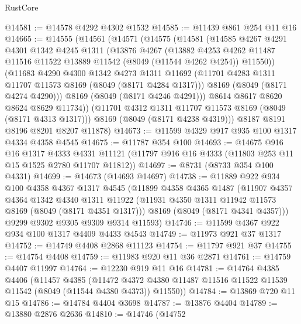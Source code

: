 \begin{lexlean}{RustCore}
\begin{coremodule}
@14581 := @14578 @4292 @4302 @1532
@14585 := @11439 @861 @254 @11 @16
@14665 := @14555
    (@14561
      (@14571
        (@14575
          (@14581
            (@14585
              @4267
              @4291
              @4301
              @1342
              @4245
              @1311
              (@13876
                @4267
                (@13882
                  @4253
                  @4262
                  @11487
                  @11516
                  @11522
                  @13889
                  @11542
                  (@8049 (@11544 @4262 @4254))
                  @11550))
              (@11683
                @4290
                @4300
                @1342
                @4273
                @1311
                @11692
                (@11701 @4283 @1311 @11707 @11573 @8169 (@8049 (@8171 @4284 @1317)))
                @8169
                (@8049 (@8171 @4274 @4290)))
              @8169
              (@8049 (@8171 @4246 @4291)))
            @8614
            @8617
            @8620
            @8624
            @8629
            @11734))
        (@11701 @4312 @1311 @11707 @11573 @8169 (@8049 (@8171 @4313 @1317)))
        @8169
        (@8049 (@8171 @4238 @4319)))
      @8187
      @8191
      @8196
      @8201
      @8207
      @11878)
@14673 := @11599 @4329 @917 @935 @100 @1317 @4334 @4358 @4545
@14675 := @11787 @354 @100
@14693 := @14675
    @916
    @16
    @1317
    @4333
    @4331
    @11121
    (@11797 @916 @16 @4333 (@11803 @253 @11 @15 @1525 @2780 @11707 @11812))
@14697 := @8731 (@8733 @354 @100 @4331)
@14699 := @14673 (@14693 @14697)
@14738 := @11889
    @922
    @934
    @100
    @4358
    @4367
    @1317
    @4545
    (@11899
      @4358
      @4365
      @1487
      (@11907
        @4357
        @4364
        @1342
        @4340
        @1311
        @11922
        (@11931 @4350 @1311 @11942 @11573 @8169 (@8049 (@8171 @4351 @1317)))
        @8169
        (@8049 (@8171 @4341 @4357)))
      @9299
      @9302
      @9305
      @9309
      @9314
      @11593)
@14746 := @11599 @4367 @922 @934 @100 @1317 @4409 @4433 @4543
@14749 := @11973 @921 @37 @1317
@14752 := @14749 @4408 @2868 @11123
@14754 := @11797 @921 @37
@14755 := @14754 @4408
@14759 := @11983 @920 @11 @36 @2871
@14761 := @14759 @4407 @11997
@14764 := @12230 @919 @11 @16
@14781 := @14764
    @4385
    @4406
    (@11457
      @4385
      (@11472 @4372 @4380 @11487 @11516 @11522 @11539 @11542 (@8049 (@11544 @4380 @4373)) @11550))
@14784 := @13869 @720 @11 @15
@14786 := @14784 @4404 @3698
@14787 := @13876 @4404
@14789 := @13880 @2876 @2636
@14810 := @14746
    (@14752

\end{coremodule}
\end{lexlean}
